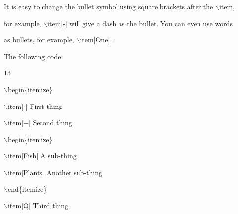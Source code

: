 \documentclass[a4paper,portrait,12pt]{article}
\begin{document}
\begin{flushleft}
It is easy to change the bullet symbol using square brackets after the \ensuremath{\backslash}item,
\end{flushleft}


\begin{flushleft}
for example, \ensuremath{\backslash}item[-] will give a dash as the bullet. You can even use words
\end{flushleft}


\begin{flushleft}
as bullets, for example, \ensuremath{\backslash}item[One].
\end{flushleft}


\begin{flushleft}
The following code:
\end{flushleft}


13





\begin{flushleft}
\newpage
\ensuremath{\backslash}begin\{itemize\}
\end{flushleft}


\begin{flushleft}
\ensuremath{\backslash}item[-] First thing
\end{flushleft}


\begin{flushleft}
\ensuremath{\backslash}item[+] Second thing
\end{flushleft}


\begin{flushleft}
\ensuremath{\backslash}begin\{itemize\}
\end{flushleft}


\begin{flushleft}
\ensuremath{\backslash}item[Fish] A sub-thing
\end{flushleft}


\begin{flushleft}
\ensuremath{\backslash}item[Plants] Another sub-thing
\end{flushleft}


\begin{flushleft}
\ensuremath{\backslash}end\{itemize\}
\end{flushleft}


\begin{flushleft}
\ensuremath{\backslash}item[Q] Third thing
\end{flushleft}
\end{document}
